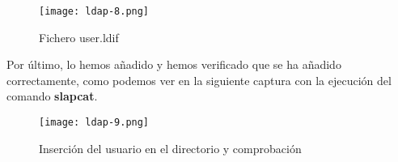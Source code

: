 \begin{figure}[H]
    \centering
    \texttt{[image: ldap-8.png]}
    \caption{Fichero user.ldif}
\end{figure}

Por último, lo hemos añadido y hemos verificado que se ha añadido correctamente, como podemos ver en la siguiente captura con la ejecución del comando \textbf{slapcat}.

\begin{figure}[H]
    \centering
    \texttt{[image: ldap-9.png]}
    \caption{Inserción del usuario en el directorio y comprobación}
\end{figure}

%
%

